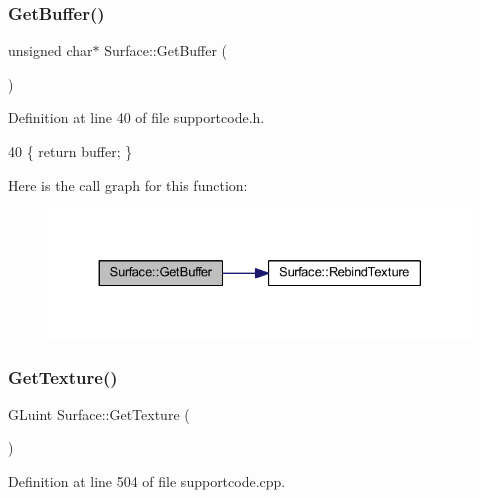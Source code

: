\subsubsection{\texorpdfstring{Get\+Buffer()}{GetBuffer()}}
{\footnotesize\ttfamily unsigned char$\ast$ Surface\+::\+Get\+Buffer (\begin{DoxyParamCaption}{ }\end{DoxyParamCaption})\hspace{0.3cm}{\ttfamily [inline]}}



Definition at line 40 of file supportcode.\+h.


\begin{DoxyCode}
40 \{ \textcolor{keywordflow}{return} buffer; \}
\end{DoxyCode}
Here is the call graph for this function\+:
\nopagebreak
\begin{figure}[H]
\begin{center}
\leavevmode
\includegraphics[width=330pt]{class_surface_a8f8da8f3ee82b8e657916f40b3f40eff_cgraph}
\end{center}
\end{figure}
\mbox{\label{class_surface_a2cd8789d26457187b8af4be8c178e9d4}} 
\subsubsection{\texorpdfstring{Get\+Texture()}{GetTexture()}}
{\footnotesize\ttfamily G\+Luint Surface\+::\+Get\+Texture (\begin{DoxyParamCaption}{ }\end{DoxyParamCaption})}



Definition at line 504 of file supportcode.\+cpp.


